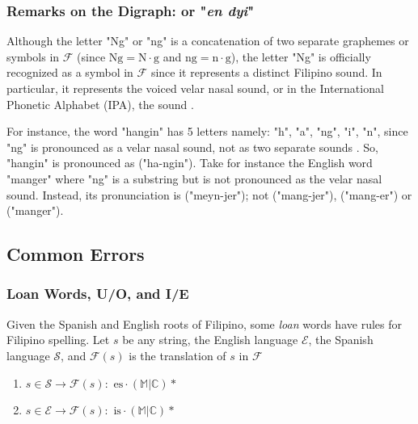 \subsubsection{Remarks on the Digraph:  or "\textit{en dyi}"}

Although the letter "Ng" or "ng" is a concatenation of two separate graphemes or
symbols in \(\mathcal{F}\) (since \(\text{Ng} = \text{N}\cdot\text{g}\) and
\(\text{ng} = \text{n}\cdot\text{g}\)), the letter "Ng" is officially recognized
as a symbol in \(\mathcal{F}\) since it represents a distinct Filipino sound.
In particular, it represents the voiced velar nasal sound, or in the International
Phonetic Alphabet (IPA), the  sound \cite{Malabonga_2009}.

For instance, the word "hangin" has 5 letters namely: "h", "a", "ng", "i", "n",
since "ng" is pronounced as a velar nasal sound, not as two separate sounds
. So, "hangin" is pronounced as  ("ha-ngin").
Take for instance the English  word "manger" where "ng" is a substring
but is not pronounced as the velar nasal sound. Instead, its pronunciation is
 ("meyn-jer"); not
 ("mang-jer"),
 ("mang-er") or
 ("manger").

\subsection{Common Errors}

\subsubsection{Loan Words, U/O, and I/E}

Given the Spanish and English roots of Filipino, some \textit{loan} words have
rules for Filipino spelling. Let \(s\) be any string, the English language
\(\mathcal{E}\), the Spanish language \(\mathcal{S}\), and \(\mathcal{F}(s)\) is
the translation of \(s\) in \(\mathcal{F}\)

\begin{enumerate}
    \item \(s\in \mathcal{S} \rightarrow \mathcal{F}(s) : \text{ es}\cdot
          (\mathbb{M}|\mathbb{C})* \)
    \item \(s\in \mathcal{E} \rightarrow \mathcal{F}(s) : \text{ is}\cdot
          (\mathbb{M}|\mathbb{C})* \)
\end{enumerate}

